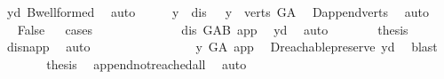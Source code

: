 \begin{isabellebody}
\ y{\isacharunderscore}{\kern0pt}d\ B{}{\isachardot}{\kern0pt}wellformed\ \isamarkupfalse%
\ auto\isanewline
\ \ \isamarkupfalse%
\ \isamarkupfalse%
\ {\isachardoublequoteopen}y\ {\isacharequal}{\kern0pt}\ dis{\isachardoublequoteclose}\ {\isacharbar}{\kern0pt}\ \ {\isachardoublequoteopen}y\ {\isasymin}\ verts\ G{\isacharunderscore}{\kern0pt}A{\isachardoublequoteclose}\ \isamarkupfalse%
\ D{}{\isachardot}{\kern0pt}append{\isacharunderscore}{\kern0pt}verts\ \isamarkupfalse%
\ auto\isanewline
\ \ \isamarkupfalse%
\ \isamarkupfalse%
\ False\isanewline
\ \ \isamarkupfalse%
{\isacharparenleft}{\kern0pt}cases{\isacharparenright}{\kern0pt}\isanewline
\ \ \ \ \isamarkupfalse%
\ {}\isanewline
\ \ \ \ \isamarkupfalse%
\ \isamarkupfalse%
\ {\isachardoublequoteopen}dis\ {\isasymrightarrow}\isactrlbsub G{\isacharunderscore}{\kern0pt}AB\isactrlesub \ app{\isachardoublequoteclose}\ \isamarkupfalse%
\ y{\isacharunderscore}{\kern0pt}d\ \isamarkupfalse%
\ auto\isanewline
\ \ \ \ \isamarkupfalse%
\ \isamarkupfalse%
\ {\isacharquery}{\kern0pt}thesis\ \isamarkupfalse%
\ dis{\isacharunderscore}{\kern0pt}n{\isacharunderscore}{\kern0pt}app\ \isamarkupfalse%
\ auto\isanewline
\ \ \isamarkupfalse%
\isanewline
\ \ \ \ \isamarkupfalse%
\ {}\isanewline
\ \ \ \ \isamarkupfalse%
\ \isamarkupfalse%
\ {\isachardoublequoteopen}y\ {\isasymrightarrow}\isactrlsup {\isacharplus}{\kern0pt}\isactrlbsub G{\isacharunderscore}{\kern0pt}A\isactrlesub \ app{\isachardoublequoteclose}\ \isamarkupfalse%
\ D{}{\isachardot}{\kern0pt}reachable{}{\isacharunderscore}{\kern0pt}preserve\ y{\isacharunderscore}{\kern0pt}d\ \isamarkupfalse%
\ blast\ \isanewline
\ \ \ \ \isamarkupfalse%
\ \isamarkupfalse%
\ {\isacharquery}{\kern0pt}thesis\ \isamarkupfalse%
\ append{\isacharunderscore}{\kern0pt}not{\isacharunderscore}{\kern0pt}reached{\isacharunderscore}{\kern0pt}all\ \isamarkupfalse%
\ auto\isanewline
\ \ \isamarkupfalse%
\ \isanewline
{}\isamarkupfalse%
%
\endisatagproof
{\isafoldproof}%
%
\isadelimproof
\ \ \ \isanewline
%
\endisadelimproof
\isanewline
\isanewline

\end{isabellebody}
